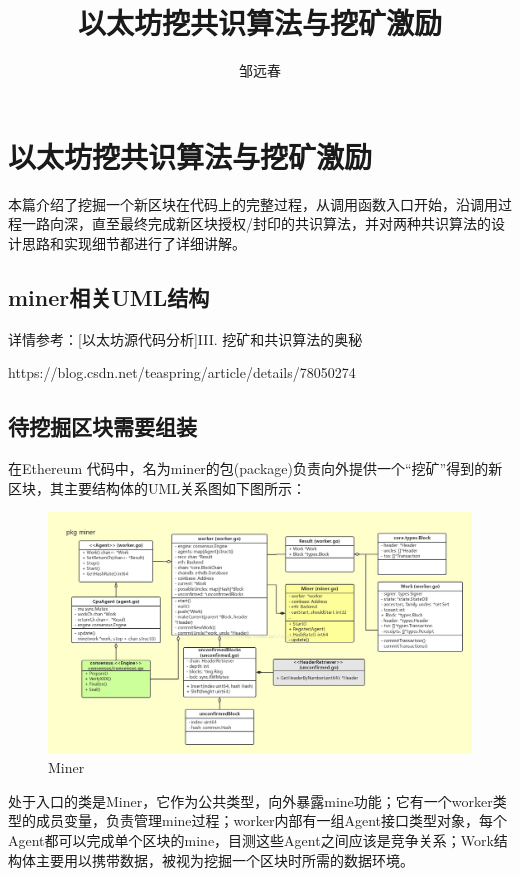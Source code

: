\documentclass[UTF8]{ctexart}
\title{以太坊挖共识算法与挖矿激励}
\author{邹远春}
\date{}
\begin{document}
\maketitle
\newcommand\Emph{\textbf}
\else
\chapter{以太坊挖共识算法与挖矿激励}
\fi

本篇介绍了挖掘一个新区块在代码上的完整过程，从调用函数入口开始，沿调用过程一路向深，直至最终完成新区块授权/封印的共识算法，并对两种共识算法的设计思路和实现细节都进行了详细讲解。


\section{miner相关UML结构}

详情参考：[以太坊源代码分析]III. 挖矿和共识算法的奥秘 

https://blog.csdn.net/teaspring/article/details/78050274

\section{待挖掘区块需要组装}

在Ethereum 代码中，名为miner的包(package)负责向外提供一个“挖矿”得到的新区块，其主要结构体的UML关系图如下图所示：

\begin{figure}
	\centering
	\includegraphics[scale=0.3]{miner.png}
	\caption{Miner}
	\label{miner}
\end{figure}

处于入口的类是Miner，它作为公共类型，向外暴露mine功能；它有一个worker类型的成员变量，负责管理mine过程；worker内部有一组Agent接口类型对象，每个Agent都可以完成单个区块的mine，目测这些Agent之间应该是竞争关系；Work结构体主要用以携带数据，被视为挖掘一个区块时所需的数据环境。
\end{document}
